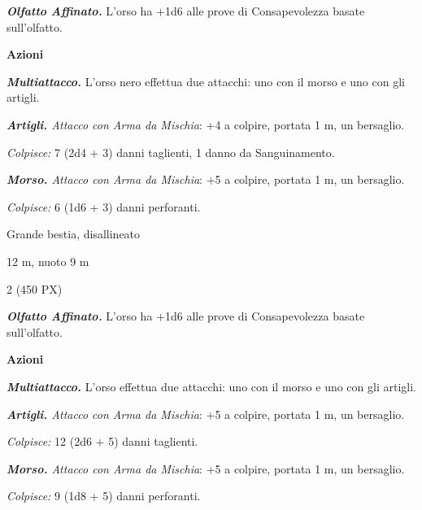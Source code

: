 \begin{multicols}{2}
{\emph{\textbf{Olfatto Affinato.}} L'orso ha +1d6 alle prove di Consapevolezza basate sull'olfatto.

\textbf{Azioni}

\emph{\textbf{Multiattacco.}} L'orso nero effettua due attacchi: uno con il morso e uno con gli artigli.

\emph{\textbf{Artigli.} Attacco con Arma da Mischia}: +4 a colpire, portata 1 m, un bersaglio.

\emph{Colpisce:} 7 (2d4 + 3) danni taglienti, 1 danno da Sanguinamento.

\emph{\textbf{Morso.} Attacco con Arma da Mischia}: +5 a colpire, portata 1 m, un bersaglio.

\emph{Colpisce:} 6 (1d6 + 3) danni perforanti.

\begin{description}[noitemsep, topsep=0pt, parsep=0pt, partopsep=0pt, itemsep=1pt, leftmargin=2.35cm,  labelwidth=2.2cm, itemindent=0cm, listparindent=0pt] %
\setlength{\baselineskip}{10pt}
\item[\textbf{Taglia/Tipo}] Grande bestia, disallineato
\item[\textbf{Caratt.}] 
\item[\textbf{Punti Ferita}] 
\item[\textbf{Tiri Salvez.}] 
\item[\textbf{Movimento}] 12 m, nuoto 9 m
\item[\textbf{Sfida}] 2 (450 PX)
\end{description}
\smallskip

\emph{\textbf{Olfatto Affinato.}} L'orso ha +1d6 alle prove di Consapevolezza basate sull'olfatto.

\textbf{Azioni}

\emph{\textbf{Multiattacco.}} L'orso effettua due attacchi: uno con il morso e uno con gli artigli.

\emph{\textbf{Artigli.} Attacco con Arma da Mischia}: +5 a colpire, portata 1 m, un bersaglio.

\emph{Colpisce:} 12 (2d6 + 5) danni taglienti.

\emph{\textbf{Morso.} Attacco con Arma da Mischia}: +5 a colpire, portata 1 m, un bersaglio.

\emph{Colpisce:} 9 (1d8 + 5) danni perforanti.

}
\end{multicols}

